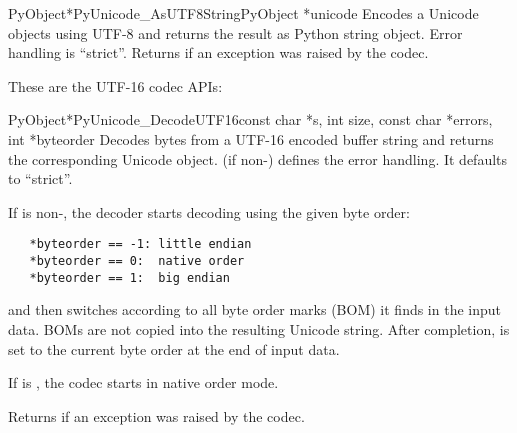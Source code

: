 \begin{cfuncdesc}{PyObject*}{PyUnicode_AsUTF8String}{PyObject *unicode}
  Encodes a Unicode objects using UTF-8 and returns the result as
  Python string object.  Error handling is ``strict''.  Returns
  \NULL{} if an exception was raised by the codec.
\end{cfuncdesc}


These are the UTF-16 codec APIs:

\begin{cfuncdesc}{PyObject*}{PyUnicode_DecodeUTF16}{const char *s,
                                               int size,
                                               const char *errors,
                                               int *byteorder}
  Decodes  bytes from a UTF-16 encoded buffer string and
  returns the corresponding Unicode object.   (if
  non-\NULL) defines the error handling. It defaults to ``strict''.

  If  is non-\NULL, the decoder starts decoding using
  the given byte order:

\begin{verbatim}
   *byteorder == -1: little endian
   *byteorder == 0:  native order
   *byteorder == 1:  big endian
\end{verbatim}

  and then switches according to all byte order marks (BOM) it finds
  in the input data.  BOMs are not copied into the resulting Unicode
  string.  After completion,  is set to the current
  byte order at the end of input data.

  If  is \NULL, the codec starts in native order mode.

  Returns \NULL{} if an exception was raised by the codec.
\end{cfuncdesc}

